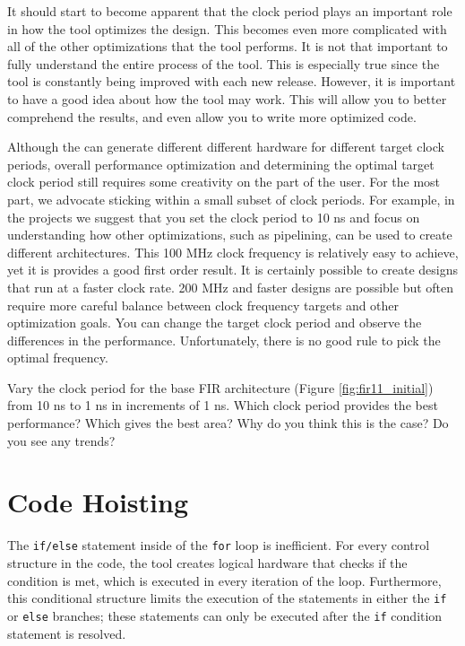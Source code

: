 It should start to become apparent that the clock period plays an important role in how the \VHLS tool optimizes the design. This becomes even more complicated with all of the other optimizations that the \VHLS tool performs. It is not that important to fully understand the entire process of the \VHLS tool. This is especially true since the tool is constantly being improved with each new release. However, it is important to have a good idea about how the tool may work. This will allow you to better comprehend the results, and even allow you to write more optimized code. 

Although the \VHLS can generate different different hardware for different target clock periods, overall performance optimization and determining the optimal target clock period still requires some creativity on the part of the user. For the most part, we advocate sticking within a small subset of clock periods. For example, in the projects we suggest that you set the clock period to 10 ns and focus on understanding how other optimizations, such as pipelining, can be used to create different architectures. This 100 MHz clock frequency is relatively easy to achieve, yet it is provides a good first order result. It is certainly possible to create designs that run at a faster clock rate.  200 MHz and faster designs are possible but often require more careful balance between clock frequency targets and other optimization goals.  You can change the target clock period and observe the differences in the performance. Unfortunately, there is no good rule to pick the optimal frequency. 

\begin{exercise}
Vary the clock period for the base FIR architecture (Figure \ref{fig:fir11_initial}) from 10 ns to 1 ns in increments of 1 ns. Which clock period provides the best performance? Which gives the best area? Why do you think this is the case? Do you see any trends? 
\end{exercise}

\section{Code Hoisting}

The \lstinline{if/else} statement inside of the \lstinline{for} loop is inefficient.  For every control structure in the code, the \VHLS tool creates logical hardware that checks if the condition is met, which is executed in every iteration of the loop. Furthermore, this conditional structure limits the execution of the statements in either the \lstinline{if} or \lstinline{else} branches; these statements can only be executed after the \lstinline{if} condition statement is resolved.

